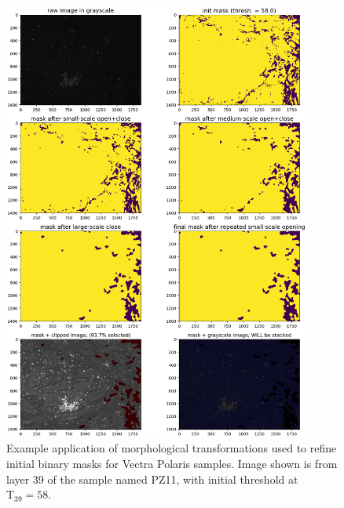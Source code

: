 \documentclass[letterpaper,11pt]{article}
\newcommand{\Tau}{\mathrm{T}}
\begin{document}
\begin{figure}[!ht]
\centering
\includegraphics[width=0.9\textwidth]{images/masking/image_614_layer_39_masks}
\caption{\footnotesize Example application of morphological transformations used to refine initial binary masks for Vectra Polaris samples. Image shown is from layer 39 of the sample named PZ11, with initial threshold at $\Tau_{39}=58$.}
\label{fig:mask_example_polaris_min}
\end{figure}
\end{document}
